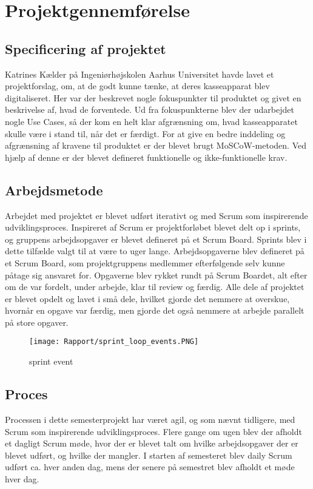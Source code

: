 \section{Projektgennemførelse}
\subsection{Specificering af projektet}
Katrines Kælder på Ingeniørhøjskolen Aarhus Universitet havde lavet et projektforslag, om, at de godt kunne tænke, at deres kasseapparat blev digitaliseret. Her var der beskrevet nogle fokuspunkter til produktet og givet en beskrivelse af, hvad de forventede. Ud fra fokuspunkterne blev der udarbejdet nogle Use Cases, så der kom en helt klar afgrænsning om, hvad kasseapparatet skulle være i stand til, når det er færdigt.
\newline
\newline
For at give en bedre inddeling og afgrænsning af kravene til produktet er der blevet brugt MoSCoW-metoden. Ved hjælp af denne er der blevet defineret funktionelle og ikke-funktionelle krav.  


\subsection{Arbejdsmetode}
Arbejdet med projektet er blevet udført iterativt og med Scrum som inspirerende udviklingsproces. Inspireret af Scrum er projektforløbet blevet delt op i sprints, og gruppens arbejdsopgaver er blevet defineret på et Scrum Board. 
\newline
Sprints blev i dette tilfælde valgt til at være to uger lange. Arbejdsopgaverne blev defineret på et Scrum Board, som projektgruppens medlemmer efterfølgende selv kunne påtage sig ansvaret for. Opgaverne blev rykket rundt på Scrum Boardet, alt efter om de var fordelt, under arbejde, klar til review og færdig. 
\newline
\newline
Alle dele af projektet er blevet opdelt og lavet i små dele, hvilket gjorde det nemmere at overskue, hvornår en opgave var færdig, men gjorde det også nemmere at arbejde parallelt på store opgaver. 

\begin{figure}[H]
	\centering
	\texttt{[image: Rapport/sprint\_loop\_events.PNG]}
	\caption{sprint event}
	\label{fig:sprint}
\end{figure} 

\subsection{Proces}
Processen i dette semesterprojekt har været agil, og som nævnt tidligere, med Scrum som inspirerende udviklingsproces.
\newline
\newline
Flere gange om ugen blev der afholdt et dagligt Scrum møde, hvor der er blevet talt om hvilke arbejdsopgaver der er blevet udført, og hvilke der mangler. I starten af semesteret blev daily Scrum udført ca. hver anden dag, mens der senere på semestret blev afholdt et møde hver dag. 


